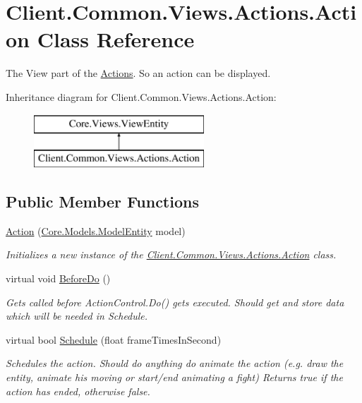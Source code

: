 \hypertarget{classClient_1_1Common_1_1Views_1_1Actions_1_1Action}{}\section{Client.\+Common.\+Views.\+Actions.\+Action Class Reference}
\label{classClient_1_1Common_1_1Views_1_1Actions_1_1Action}


The View part of the \hyperlink{namespaceClient_1_1Common_1_1Views_1_1Actions}{Actions}. So an action can be displayed.  


Inheritance diagram for Client.\+Common.\+Views.\+Actions.\+Action\+:\begin{figure}[H]
\begin{center}
\leavevmode
\includegraphics[height=2.000000cm]{classClient_1_1Common_1_1Views_1_1Actions_1_1Action}
\end{center}
\end{figure}
\subsection*{Public Member Functions}
\begin{DoxyCompactItemize}
\item 
\hyperlink{classClient_1_1Common_1_1Views_1_1Actions_1_1Action_ae6ccd18f995bf709877f508c65308c42}{Action} (\hyperlink{classCore_1_1Models_1_1ModelEntity}{Core.\+Models.\+Model\+Entity} model)
\begin{DoxyCompactList}\small\item\em Initializes a new instance of the \hyperlink{classClient_1_1Common_1_1Views_1_1Actions_1_1Action}{Client.\+Common.\+Views.\+Actions.\+Action} class. \end{DoxyCompactList}\item 
virtual void \hyperlink{classClient_1_1Common_1_1Views_1_1Actions_1_1Action_ad129f8cb1d8079f76d8199dbc80d3c0d}{Before\+Do} ()
\begin{DoxyCompactList}\small\item\em Gets called before Action\+Control.\+Do() gets executed. Should get and store data which will be needed in Schedule. \end{DoxyCompactList}\item 
virtual bool \hyperlink{classClient_1_1Common_1_1Views_1_1Actions_1_1Action_a92fdf89fb39016ef84e08dc3c7352d51}{Schedule} (float frame\+Times\+In\+Second)
\begin{DoxyCompactList}\small\item\em Schedules the action. Should do anything do animate the action (e.\+g. draw the entity, animate his moving or start/end animating a fight) Returns true if the action has ended, otherwise false. \end{DoxyCompactList}\end{DoxyCompactItemize}
